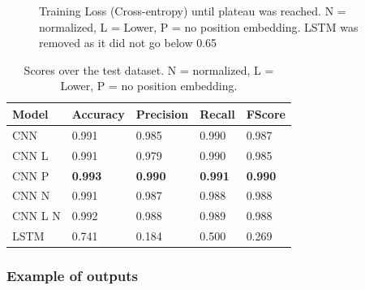\documentclass{jdmdh}
\begin{document}
\begin{figure}
  \begin{center}
    \caption{Training Loss (Cross-entropy) until plateau was reached. N = normalized, L = Lower, P = no position embedding. LSTM was removed as it did not go below 0.65}
  \label{fig:loss}
  \end{center}
\end{figure}

\begin{table}
\centering
\begin{tabular}{lllll}
\hline
Model   & Accuracy & Precision & Recall & FScore \\ \hline
CNN     & 0.991    & 0.985     & 0.990  & 0.987  \\
CNN L   & 0.991    & 0.979     & 0.990  & 0.985  \\
CNN P   & \textbf{0.993}    & \textbf{0.990}& \textbf{0.991}  & \textbf{0.990}  \\
CNN N   & 0.991    & 0.987     & 0.988  & 0.988  \\
CNN L N & 0.992    & 0.988     & 0.989  & 0.988  \\
LSTM    & 0.741    & 0.184     & 0.500  & 0.269  \\ \hline
\end{tabular}
\caption{Scores over the test dataset. N = normalized, L = Lower, P = no position embedding.}
\label{tab:scores}
\end{table}

\subsubsection{Example of outputs}
\end{document}
